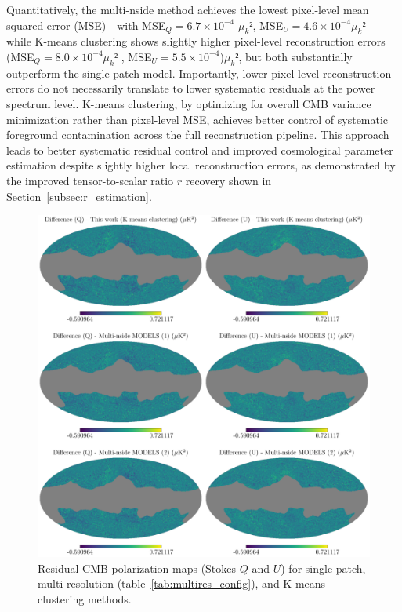 \documentclass[fleqn,usenatbib]{mnras}
\begin{document}
Quantitatively, the multi-nside method achieves the lowest pixel-level mean squared error (MSE)—with MSE\(_Q = 6.7 \times 10^{-4}\) $\mu_k²$, MSE\(_U = 4.6 \times 10^{-4}\)$\mu_k²$—while K-means clustering shows slightly higher pixel-level reconstruction errors (MSE\(_Q = 8.0 \times 10^{-4}\)$\mu_k²$ , MSE\(_U = 5.5 \times 10^{-4}\))$\mu_k²$, but both substantially outperform the single-patch model. Importantly, lower pixel-level reconstruction errors do not necessarily translate to lower systematic residuals at the power spectrum level. K-means clustering, by optimizing for overall CMB variance minimization rather than pixel-level MSE, achieves better control of systematic foreground contamination across the full reconstruction pipeline. This approach leads to better systematic residual control and improved cosmological parameter estimation despite slightly higher local reconstruction errors, as demonstrated by the improved tensor-to-scalar ratio \( r \) recovery shown in Section~\ref{subsec:r_estimation}.

\begin{figure}
    \centering
    \includegraphics[width=\linewidth]{figures/cmb_recon.pdf}
    \caption{
    Residual CMB polarization maps (Stokes \( Q \) and \( U \)) for single-patch, multi-resolution (table~\ref{tab:multires_config}), and K-means clustering methods.  
    }
    \label{fig:cmb_qu_comparison}
\end{figure}
\end{document}
